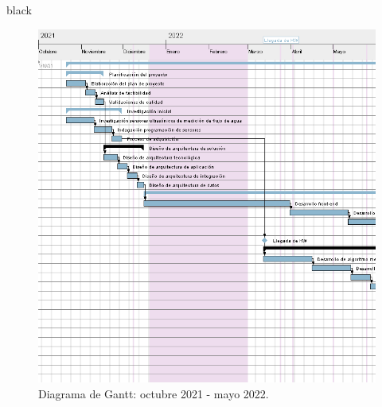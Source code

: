\documentclass[
11pt, %
codirector, %
]{charter}
\begin{document}
\begin{consigna}{black}


\begin{figure}[htpb]
\centering 
\includegraphics[height=.7\textheight]{./Figuras/TF-gantt1.png}
\caption{Diagrama de Gantt: octubre 2021 - mayo 2022.}
\label{fig:diagGantt1}
\end{figure}


\end{consigna}
\end{document}
